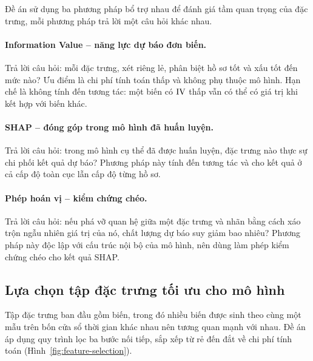 Đề án sử dụng ba phương pháp bổ trợ nhau để đánh giá tầm quan trọng của đặc
trưng, mỗi phương pháp trả lời một câu hỏi khác nhau.

\paragraph{Information Value -- năng lực dự báo đơn biến.} Trả lời câu hỏi: mỗi
đặc trưng, xét riêng lẻ, phân biệt hồ sơ tốt và xấu tốt đến mức nào? Ưu điểm là
chi phí tính toán thấp và không phụ thuộc mô hình. Hạn chế là không tính đến
tương tác: một biến có $\mathrm{IV}$ thấp vẫn có thể có giá trị khi kết hợp với biến
khác.

\paragraph{SHAP -- đóng góp trong mô hình đã huấn luyện.} Trả lời câu hỏi: trong
mô hình cụ thể đã được huấn luyện, đặc trưng nào thực sự chi phối kết quả dự báo?
Phương pháp này tính đến tương tác và cho kết quả ở cả cấp độ toàn cục lẫn cấp độ
từng hồ sơ.

\paragraph{Phép hoán vị -- kiểm chứng chéo.} Trả lời câu hỏi: nếu phá vỡ quan hệ
giữa một đặc trưng và nhãn bằng cách xáo trộn ngẫu nhiên giá trị của nó, chất
lượng dự báo suy giảm bao nhiêu? Phương pháp này độc lập với cấu trúc nội bộ của
mô hình, nên dùng làm phép kiểm chứng chéo cho kết quả SHAP.

\subsection{Lựa chọn tập đặc trưng tối ưu cho mô hình}
\label{subsec:lua-chon-dac-trung}

Tập đặc trưng ban đầu gồm \NFeaturesInitial{} biến, trong đó nhiều biến được sinh
theo cùng một mẫu trên bốn cửa sổ thời gian khác nhau nên tương quan mạnh với
nhau. Đề án áp dụng quy trình lọc ba bước nối tiếp, sắp xếp từ rẻ đến đắt về chi
phí tính toán (Hình~\ref{fig:feature-selection}).

